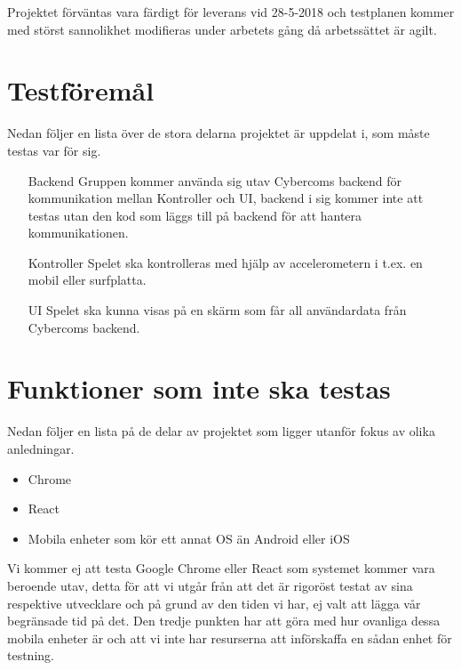   Projektet förväntas vara färdigt för leverans vid 28-5-2018 och testplanen kommer med störst sannolikhet modifieras under arbetets gång då arbetssättet är agilt.




  




\section{Testföremål}
	Nedan följer en lista över de stora delarna projektet är uppdelat i, som måste testas var för sig.
	\begin{itemize}
	\item [Backend] Gruppen kommer använda sig utav Cybercoms backend för kommunikation mellan Kontroller och UI, backend i sig kommer inte att testas utan den kod som läggs till på backend för att hantera kommunikationen.
	\item [Kontroller] Spelet ska kontrolleras med hjälp av accelerometern i t.ex. en mobil eller surfplatta.
	\item [UI] Spelet ska kunna visas på en skärm som får all användardata från Cybercoms backend.
	\end{itemize}


\section{Funktioner som inte ska testas}
	Nedan följer en lista på de delar av projektet som ligger utanför fokus av olika anledningar.
	\begin{itemize}
	\item Chrome
	\item React
	\item Mobila enheter som kör ett annat OS än Android eller iOS
	\end{itemize}
	Vi kommer ej att testa Google Chrome eller React som systemet kommer vara beroende utav, detta för att vi utgår från att det är rigoröst testat av sina respektive utvecklare och på grund av den tiden vi har, ej valt att lägga vår begränsade tid på det. Den tredje punkten har att göra med hur ovanliga dessa mobila enheter är och att vi inte har resurserna att införskaffa en sådan enhet för testning.




